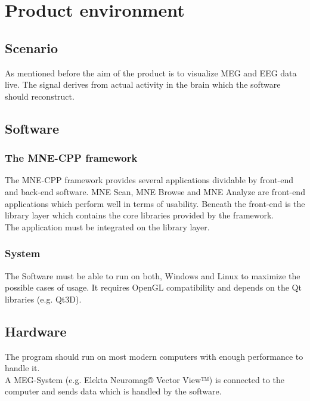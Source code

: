 \section {Product environment}
\subsection{Scenario}
As mentioned before the aim of the product is to visualize MEG and EEG data live. The signal derives from actual activity in the brain which the software should reconstruct. 


\subsection{Software}
\subsubsection{The MNE-CPP framework}The MNE-CPP framework provides several applications dividable by front-end and back-end software. MNE Scan, MNE Browse and MNE Analyze are front-end applications which perform well in terms of usability.
Beneath the front-end is the library layer which contains the core libraries provided by the framework.\\
The application must be integrated on the library layer.
\subsubsection{System}
The Software must be able to run on both, Windows and Linux to maximize the possible cases of usage. It requires OpenGL compatibility and depends on the Qt libraries (e.g. Qt3D).
\subsection{Hardware}
The program should run on most modern computers with enough performance to handle it. \\
A MEG-System (e.g. Elekta Neuromag® Vector View™) is connected to the computer and sends data which is handled by the software.